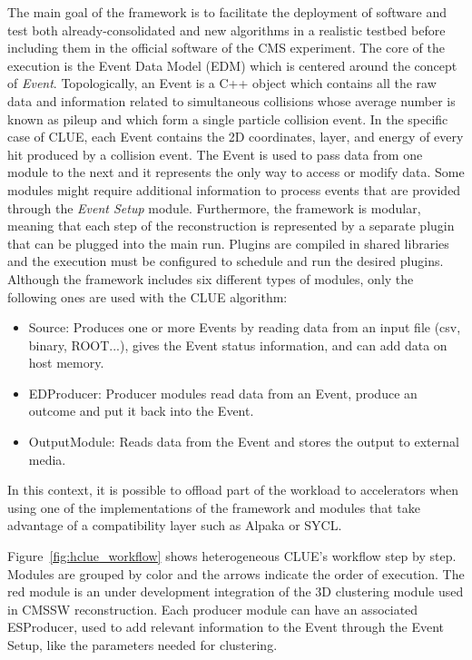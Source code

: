 The main goal of the framework is to facilitate the deployment of software and test both already-consolidated and new algorithms in a realistic testbed before including them in the official software of the CMS experiment. The core of the execution is the Event Data Model (EDM) which is centered around the concept of \emph{Event}. Topologically, an Event is a C++ object which contains all the raw data and information related to simultaneous collisions whose average number is known as pileup and which form a single particle collision event. In the specific case of CLUE, each Event contains the 2D coordinates, layer, and energy of every hit produced by a collision event. The Event is used to pass data from one module to the next and it represents the only way to access or modify data. Some modules might require additional information to process events that are provided through the \emph{Event Setup} module. Furthermore, the framework is modular, meaning that each step of the reconstruction is represented by a separate plugin that can be plugged into the main run. Plugins are compiled in shared libraries and the execution must be configured to schedule and run the desired plugins. Although the framework includes six different types of modules, only the following ones are used with the CLUE algorithm:
\begin{itemize}
    \item Source: Produces one or more Events by reading data from an input file (csv, binary, ROOT...), gives the Event status information, and can add data on host memory. 
    \item EDProducer: Producer modules read data from an Event, produce an outcome and put it back into the Event.
    \item OutputModule: Reads data from the Event and stores the output to external media.
\end{itemize}

In this context, it is possible to offload part of the workload to accelerators when using one of the implementations of the framework and modules that take advantage of a compatibility layer such as Alpaka or SYCL.

Figure~\ref{fig:hclue_workflow} shows heterogeneous CLUE's workflow step by step. Modules are grouped by color and the arrows indicate the order of execution. The red module is an under development integration of the 3D clustering module used in CMSSW reconstruction. Each producer module can have an associated ESProducer, used to add relevant information to the Event through the Event Setup, like the parameters needed for clustering. 

